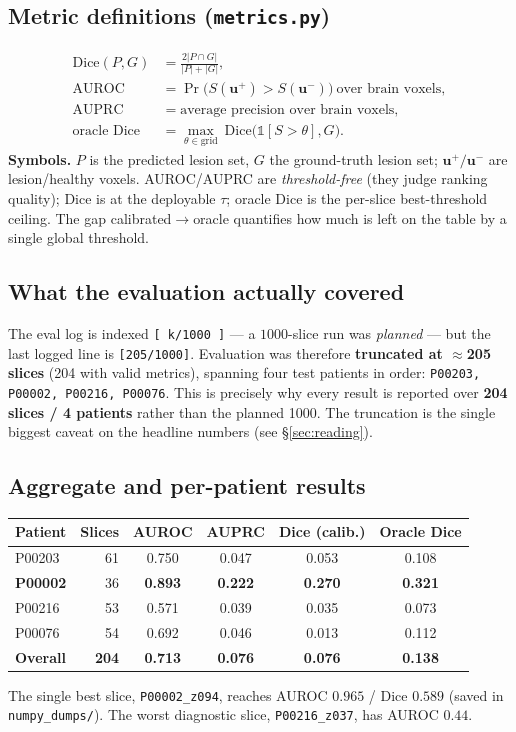 \documentclass[11pt,a4paper]{article}
\newcommand{\code}[1]{\texttt{\small #1}}
\begin{document}
\subsection{Metric definitions (\code{metrics.py})}
\begin{align}
\text{Dice}(P,G) &= \frac{2|P\cap G|}{|P|+|G|},\\
\text{AUROC} &= \Pr\!\big(S(\bm u^+)>S(\bm u^-)\big)\ \text{over brain voxels},\\
\text{AUPRC} &= \text{average precision over brain voxels},\\
\text{oracle Dice} &= \max_{\theta\in\text{grid}}\ \text{Dice}\big(\mathbb 1[S>\theta],G\big).
\end{align}
\textbf{Symbols.} $P$ is the predicted lesion set, $G$ the ground-truth lesion
set; $\bm u^+/\bm u^-$ are lesion/healthy voxels. AUROC/AUPRC are
\emph{threshold-free} (they judge ranking quality); Dice is at the deployable
$\tau$; oracle Dice is the per-slice best-threshold ceiling. The gap
calibrated$\to$oracle quantifies how much is left on the table by a single global
threshold.

\subsection{What the evaluation actually covered}
The eval log is indexed \code{[\,k/1000\,]} --- a $1000$-slice run was
\emph{planned} --- but the last logged line is \code{[205/1000]}. Evaluation was
therefore \textbf{truncated at $\approx$205 slices} (204 with valid metrics),
spanning four test patients in order: \texttt{P00203, P00002, P00216, P00076}.
This is precisely why every result is reported over \textbf{204 slices / 4
patients} rather than the planned 1000. The truncation is the single biggest
caveat on the headline numbers (see \S\ref{sec:reading}).

\subsection{Aggregate and per-patient results}
\begin{longtable}{@{}lrcccc@{}}
\toprule
Patient & Slices & AUROC & AUPRC & Dice (calib.) & Oracle Dice \\
\midrule
\endhead
P00203 & 61 & 0.750 & 0.047 & 0.053 & 0.108 \\
\textbf{P00002} & 36 & \textbf{0.893} & \textbf{0.222} & \textbf{0.270} & \textbf{0.321} \\
P00216 & 53 & 0.571 & 0.039 & 0.035 & 0.073 \\
P00076 & 54 & 0.692 & 0.046 & 0.013 & 0.112 \\
\midrule
\textbf{Overall} & \textbf{204} & \textbf{0.713} & \textbf{0.076} & \textbf{0.076} & \textbf{0.138} \\
\bottomrule
\end{longtable}
\noindent
The single best slice, \texttt{P00002\_z094}, reaches AUROC $0.965$ / Dice
$0.589$ (saved in \code{numpy\_dumps/}). The worst diagnostic slice,
\texttt{P00216\_z037}, has AUROC $0.44$.
\end{document}
